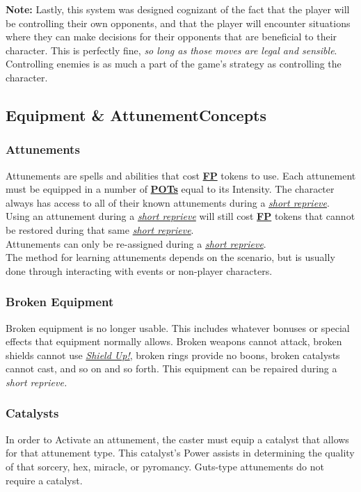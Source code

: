 \documentclass[12pt]{article}
\newcommand{\refto}[1]{\hyperlink{#1}{\textbf{#1}}}
\newcommand{\reftoit}[1]{\hyperlink{#1}{\emph{#1}}}
\begin{document}
\begin{multicols*}{2}
\vfill

\begin{tcolorbox}
\textbf{Note:} Lastly, this system was designed cognizant of the fact that the player will be controlling their own opponents, and that the player will encounter situations where they can make decisions for their opponents that are beneficial to their character. This is perfectly fine, \emph{so long as those moves are legal and sensible}.\\

Controlling enemies is as much a part of the game’s strategy as controlling the character.
\end{tcolorbox}

\vfill
\pagebreak

\subsection{Equipment \& Attunement\newline Concepts}

\subsubsection{Attunements}
Attunements are spells and abilities that cost \refto{FP} tokens to use. Each attunement must be equipped in a number of \refto{POTs} equal to its Intensity. The character always has access to all of their known attunements during a \reftoit{short reprieve}. Using an attunement during a \reftoit{short reprieve} will still cost \refto{FP} tokens that cannot be restored during that same \reftoit{short reprieve}.\\
Attunements can only be re-assigned during a \reftoit{short reprieve}.\\
The method for learning attunements depends on the scenario, but is usually done through interacting with events or non-player characters.

\subsubsection{Broken Equipment}
Broken equipment is no longer usable. This includes whatever bonuses or special effects that equipment normally allows. Broken weapons cannot attack, broken shields cannot use \reftoit{Shield Up!}, broken rings provide no boons, broken catalysts cannot cast, and so on and so forth. This equipment can be repaired during a \emph{short reprieve.}

\subsubsection{Catalysts}
In order to Activate an attunement, the caster must equip a catalyst that allows for that attunement type. This catalyst’s Power assists in determining the quality of that sorcery, hex, miracle, or pyromancy. Guts-type attunements do not require a catalyst.


\end{multicols*}
\end{document}
